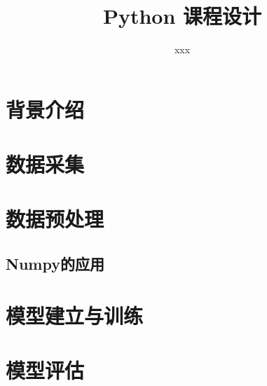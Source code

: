 \documentclass[UTF8]{article}
\title{Python 课程设计}
\author{xxx}
\date{}
\begin{document}
\maketitle

\section{背景介绍}

\section{数据采集}
\section{数据预处理}
\subsection{Numpy的应用}
\section{模型建立与训练}
\section{模型评估}
\end{document}
